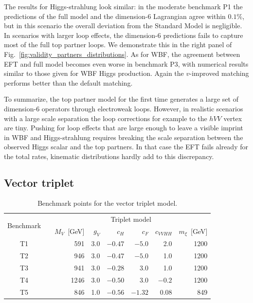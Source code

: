 The results for Higgs-strahlung look similar: in the moderate
benchmark P1 the predictions of the full model and the dimension-6
Lagrangian agree within $0.1 \%$, but in this scenario the overall
deviation from the Standard Model is negligible. In scenarios with
larger loop effects, the dimension-6 predictions fails to capture most
of the full top partner loops.  We demonstrate this in the right panel
of Fig.~\ref{fig:validity_partners_distributions}.  As for WBF, the agreement
between EFT and full model becomes even worse in benchmark P3, with
numerical results similar to those given for WBF Higgs
production. Again the $v$-improved matching performs better than the
default matching.\medskip

To summarize, the top partner model for the first time generates a
large set of dimension-6 operators through electroweak loops. However,
in realistic scenarios with a large scale separation the loop
corrections for example to the $hVV$ vertex are tiny.  Pushing for
loop effects that are large enough to leave a visible imprint in WBF
and Higgs-strahlung requires breaking the scale separation between the
observed Higgs scalar and the top partners. In that case the EFT fails
already for the total rates, kinematic distributions hardly add to
this discrepancy.



\subsection{Vector triplet}
\label{sec:validity_triplet}

\begin{table}[t] \renewcommand{\arraystretch}{1.2}
\setlength{\tabcolsep}{0.3em} \centering
    \begin{tabular}{c c rrrrrr} \toprule \multirow{2}{*}{Benchmark}
&\hspace*{1em}& \multicolumn{6}{c}{Triplet model} \\ \cmidrule{3-8} &&
$M_V$~[GeV] & $g_V$ & $c_H$ & ${c}_{F}$ & ${c}_{VVHH}$ & $m_\xi$~[GeV]
\\ \midrule T1 && 591 & 3.0 & $-0.47$ & $-5.0$ & 2.0 & 1200 \\ T2 &&
946 & 3.0 & $-0.47$ & $-5.0$ & 1.0 & 1200 \\ T3 && 941 & 3.0 & $-0.28$
& $3.0$ & 1.0 & 1200 \\ T4 && 1246 & 3.0 & $-0.50$ & $3.0$ & $-0.2$ &
1200 \\ T5 && 846 & 1.0 & $-0.56$ & $-1.32$ & $0.08$ & 849 \\
\bottomrule
    \end{tabular}
  \caption{Benchmark points for the vector triplet model.}
  \label{tab:triplet_benchmarks} \setlength{\tabcolsep}{0.5em}
\end{table}

